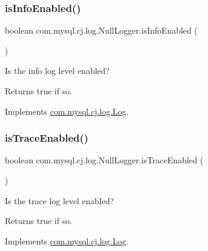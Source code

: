 \subsubsection{\texorpdfstring{is\+Info\+Enabled()}{isInfoEnabled()}}
{\footnotesize\ttfamily boolean com.\+mysql.\+cj.\+log.\+Null\+Logger.\+is\+Info\+Enabled (\begin{DoxyParamCaption}{ }\end{DoxyParamCaption})}

Is the \textquotesingle{}info\textquotesingle{} log level enabled?

\begin{DoxyReturn}{Returns}
true if so. 
\end{DoxyReturn}


Implements \mbox{\hyperlink{interfacecom_1_1mysql_1_1cj_1_1log_1_1_log_aecb7f781b61b516d6bad9ada8e7dd3aa}{com.\+mysql.\+cj.\+log.\+Log}}.

\mbox{\label{classcom_1_1mysql_1_1cj_1_1log_1_1_null_logger_aec3c94f0980a5539603a7ab12b270356}} 
\subsubsection{\texorpdfstring{is\+Trace\+Enabled()}{isTraceEnabled()}}
{\footnotesize\ttfamily boolean com.\+mysql.\+cj.\+log.\+Null\+Logger.\+is\+Trace\+Enabled (\begin{DoxyParamCaption}{ }\end{DoxyParamCaption})}

Is the \textquotesingle{}trace\textquotesingle{} log level enabled?

\begin{DoxyReturn}{Returns}
true if so. 
\end{DoxyReturn}


Implements \mbox{\hyperlink{interfacecom_1_1mysql_1_1cj_1_1log_1_1_log_a814070e176d987da656b45662bc63ccd}{com.\+mysql.\+cj.\+log.\+Log}}.

\mbox{\label{classcom_1_1mysql_1_1cj_1_1log_1_1_null_logger_ae2749400e4e820f091a583795111f5a7}} 

